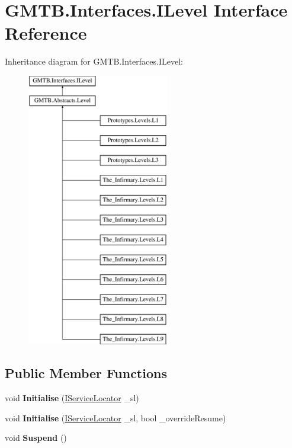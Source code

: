 \hypertarget{interface_g_m_t_b_1_1_interfaces_1_1_i_level}{}\section{G\+M\+T\+B.\+Interfaces.\+I\+Level Interface Reference}
\label{interface_g_m_t_b_1_1_interfaces_1_1_i_level}
Inheritance diagram for G\+M\+T\+B.\+Interfaces.\+I\+Level\+:\begin{figure}[H]
\begin{center}
\leavevmode
\includegraphics[height=12.000000cm]{interface_g_m_t_b_1_1_interfaces_1_1_i_level}
\end{center}
\end{figure}
\subsection*{Public Member Functions}
\begin{DoxyCompactItemize}
\item 
\mbox{\label{interface_g_m_t_b_1_1_interfaces_1_1_i_level_abdbb8175e7b5983645d51e02f8f42a2e}} 
void {\bfseries Initialise} (\mbox{\hyperlink{interface_g_m_t_b_1_1_interfaces_1_1_i_service_locator}{I\+Service\+Locator}} \+\_\+sl)
\item 
\mbox{\label{interface_g_m_t_b_1_1_interfaces_1_1_i_level_a98a99420f5e4ed57295d130fef60dc39}} 
void {\bfseries Initialise} (\mbox{\hyperlink{interface_g_m_t_b_1_1_interfaces_1_1_i_service_locator}{I\+Service\+Locator}} \+\_\+sl, bool \+\_\+override\+Resume)
\item 
\mbox{\label{interface_g_m_t_b_1_1_interfaces_1_1_i_level_a13d905c06defbeabeda91e5b662a0fab}} 
void {\bfseries Suspend} ()
\end{DoxyCompactItemize}

